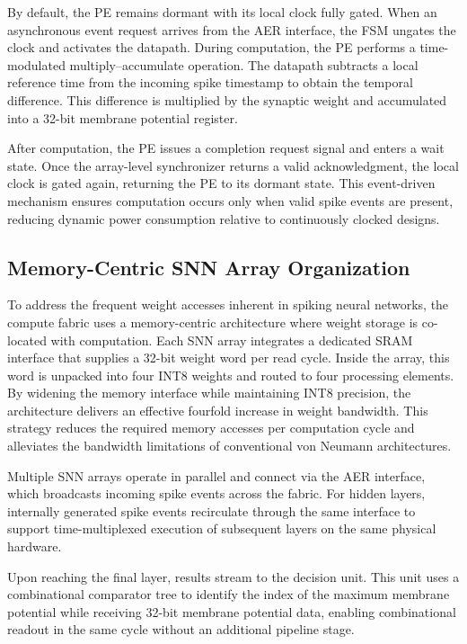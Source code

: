 \documentclass[12pt]{article}
\begin{document}
By default, the PE remains dormant with its local clock fully gated. When an asynchronous event request arrives from the AER interface, the FSM ungates the clock and activates the datapath. During computation, the PE performs a time-modulated multiply--accumulate operation. The datapath subtracts a local reference time from the incoming spike timestamp to obtain the temporal difference. This difference is multiplied by the synaptic weight and accumulated into a 32-bit membrane potential register.

After computation, the PE issues a completion request signal and enters a wait state. Once the array-level synchronizer returns a valid acknowledgment, the local clock is gated again, returning the PE to its dormant state. This event-driven mechanism ensures computation occurs only when valid spike events are present, reducing dynamic power consumption relative to continuously clocked designs.


\subsection{Memory-Centric SNN Array Organization}

To address the frequent weight accesses inherent in spiking neural networks, the compute fabric uses a memory-centric architecture where weight storage is co-located with computation. Each SNN array integrates a dedicated SRAM interface that supplies a 32-bit weight word per read cycle. Inside the array, this word is unpacked into four INT8 weights and routed to four processing elements. By widening the memory interface while maintaining INT8 precision, the architecture delivers an effective fourfold increase in weight bandwidth. This strategy reduces the required memory accesses per computation cycle and alleviates the bandwidth limitations of conventional von Neumann architectures.

Multiple SNN arrays operate in parallel and connect via the AER interface, which broadcasts incoming spike events across the fabric. For hidden layers, internally generated spike events recirculate through the same interface to support time-multiplexed execution of subsequent layers on the same physical hardware.

Upon reaching the final layer, results stream to the decision unit. This unit uses a combinational comparator tree to identify the index of the maximum membrane potential while receiving 32-bit membrane potential data, enabling combinational readout in the same cycle without an additional pipeline stage.
\end{document}
